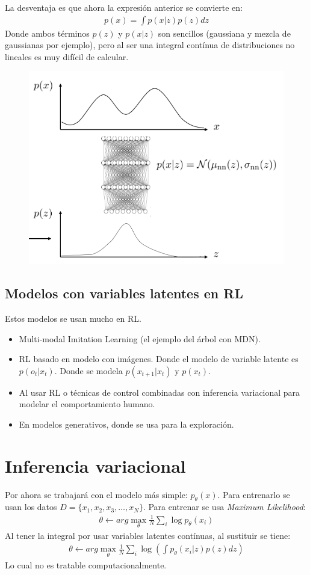La desventaja es que ahora la expresión anterior se convierte en:
\begin{align}
    p(x)=\int p(x|z)p(z)dz
\end{align}
Donde ambos términos $p(z)$ y $p(x|z)$ son sencillos (gaussiana y mezcla de gaussianas por
ejemplo), pero al ser una integral contínua de distribuciones no lineales es muy difícil de
calcular.

\begin{figure}[H]
	\centering
	\includegraphics[width=0.5\linewidth]{figures/2020-07-01-124946_583x441_scrot.png}
\end{figure}

\subsection{Modelos con variables latentes en RL}%
\label{sub:modelos_con_variables_latentes_en_rl}

Estos modelos se usan mucho en RL.
\begin{itemize}
    \item Multi-modal Imitation Learning (el ejemplo del árbol con MDN).
    \item RL basado en modelo con imágenes. Donde el modelo de variable latente es
        $p(o_t|x_t)$. Donde se modela  $p(x_{t+1}|x_t)$ y  $p(x_t)$.
    \item Al usar RL o técnicas de control combinadas con inferencia variacional para
        modelar el comportamiento humano.
    \item En modelos generativos, donde se usa para la exploración.
\end{itemize}

\section{Inferencia variacional}%
\label{sec:inferencia_variacional}

Por ahora se trabajará con el modelo más simple: $p_\theta(x)$. Para entrenarlo se usan
los datos  $D=\{x_1,x_2,x_3,\ldots,x_N\}$. Para entrenar se usa \textit{Maximum
Likelihood}:
\begin{align}
    \theta \gets arg\max_\theta \frac{1}{N} \sum_i \log p_\theta (x_i)
\end{align}
Al tener la integral por usar variables latentes contínuas, al sustituir se tiene:
\begin{align}
    \theta \gets arg\max_\theta \frac{1}{N} \sum_i \log \left(\int p_\theta(x_i|z)p(z)dz\right)
\end{align}
Lo cual no es tratable computacionalmente.

